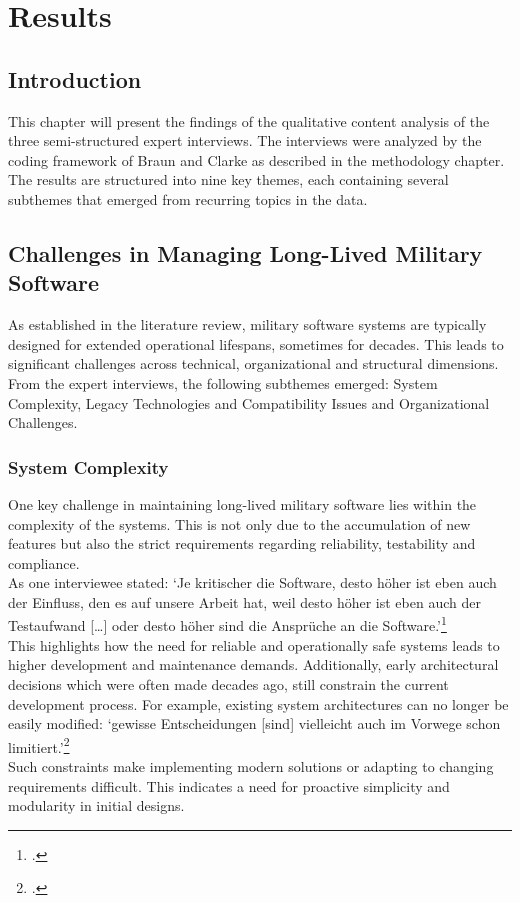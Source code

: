 \section{Results}
\subsection{Introduction}
This chapter will present the findings of the qualitative content analysis of the three semi-structured expert interviews. The interviews were analyzed by the coding framework of Braun and Clarke as described in the methodology chapter.
The results are structured into nine key themes, each containing several subthemes that emerged from recurring topics in the data.
\subsection{Challenges in Managing Long-Lived Military Software}
As established in the literature review, military software systems are typically designed for extended operational lifespans, sometimes for decades. This leads to significant challenges across technical, organizational and structural dimensions.
From the expert interviews, the following subthemes emerged: System Complexity, Legacy Technologies and Compatibility Issues and Organizational Challenges.

\subsubsection{System Complexity}
One key challenge in maintaining long-lived military software lies within the complexity of the systems. This is not only due to the accumulation of new features but also the strict requirements regarding reliability, testability and compliance.\\

As one interviewee stated: `Je kritischer die Software, desto höher ist eben auch der Einfluss, den es auf unsere Arbeit hat, weil desto höher ist eben auch der Testaufwand [\ldots] oder desto höher sind die Ansprüche an die Software.'\footcite{interview2}\\

This highlights how the need for reliable and operationally safe systems leads to higher development and maintenance demands. Additionally, early architectural decisions which were often made decades ago, 
still constrain the current development process. For example, existing system architectures can no longer be easily modified: `gewisse Entscheidungen [sind] vielleicht auch im Vorwege schon limitiert.'\footcite{interview1}\\
Such constraints make implementing modern solutions or adapting to changing requirements difficult. This indicates a need for proactive simplicity and modularity in initial designs.

